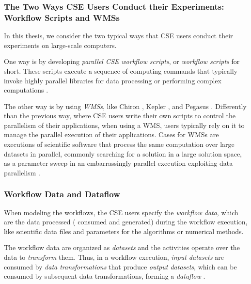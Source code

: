 \subsubsection{The Two Ways CSE Users Conduct their Experiments: Workflow Scripts and WMSs}

In this thesis, we consider the two typical ways that CSE users conduct their experiments on large-scale computers.

One way is by developing \textit{parallel CSE workflow scripts}, or \textit{workflow scripts} for short. These scripts execute a sequence of computing commands that typically invoke highly parallel libraries for data processing or performing complex computations \cite{Bernholdt2017Improving, Bauer2016In}.

The other way is by using \textit{WMSs}, like Chiron \cite{Ogasawara2011algebraic}, Kepler \cite{Nguyen2015WorkWays:}, and Pegasus \cite{Deelman2015Pegasus}.
Differently than the previous way, where CSE users write their own scripts to control the parallelism of their applications, when using a WMS, users typically rely on it to manage the parallel execution of their applications. Cases for WMSs are executions of scientific software that process the same computation over large datasets in parallel, commonly searching for a solution in a large solution space, as a parameter sweep in an embarrassingly parallel execution exploiting data parallelism
\cite{F.daSilva2017characterization, Silva2017Raw, Souza2017Data}.

\subsubsection{Workflow Data and Dataflow}

When modeling the workflows, the CSE users specify the \textit{workflow data}, which are the data processed (\ie{} consumed and generated) during the workflow execution, like scientific data files and parameters for the algorithms or numerical methods.

The workflow data are organized as \textit{datasets} and the activities operate over the data to \textit{transform} them. Thus, in a workflow execution, \textit{input datasets} are consumed by \textit{data transformations} that produce \textit{output datasets}, which can be consumed by subsequent data transformations, forming a \textit{dataflow}
\cite{Silva2017Raw, Souza2017Data}
.


